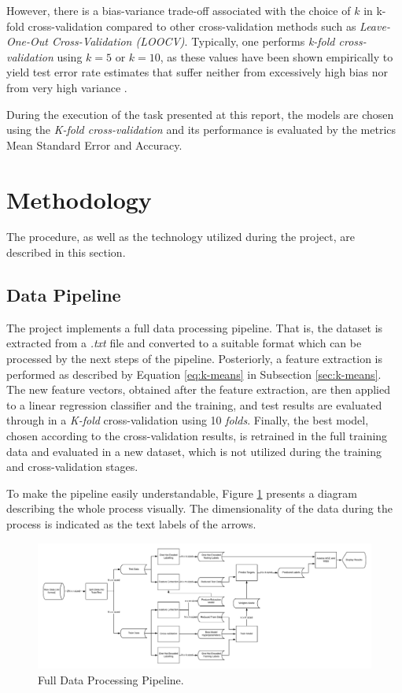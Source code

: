 \documentclass{article}
\begin{document}
However, there is a bias-variance trade-off associated with the choice of $k$ in k-fold cross-validation compared to other cross-validation methods such as \textit{Leave-One-Out Cross-Validation (LOOCV)}. Typically, one performs \textit{k-fold cross-validation} using $k = 5$ or $k = 10$, as these values have been shown empirically to yield test error rate estimates that suffer neither from excessively high bias nor from very high variance \parencite{james2013introduction}.

During the execution of the task presented at this report, the models are chosen using the \textit{K-fold cross-validation} and its performance is evaluated by the metrics Mean Standard Error and Accuracy.

\section{Methodology}

The procedure, as well as the technology utilized during the project, are described in this section. 

\subsection{Data Pipeline}

The project implements a full data processing pipeline. That is, the dataset is extracted from a \textit{.txt} file and converted to a suitable format which can be processed by the next steps of the pipeline. Posteriorly, a feature extraction is performed as described by Equation \eqref{eq:k-means} in Subsection \ref{sec:k-means}. The new feature vectors, obtained after the feature extraction, are then applied to a linear regression classifier and the training, and test results are evaluated through in a \textit{K-fold} cross-validation using 10 \textit{folds}. Finally, the best model, chosen according to the cross-validation results, is retrained in the full training data and evaluated in a new dataset, which is not utilized during the training and cross-validation stages.

To make the pipeline easily understandable, Figure \ref{fig:pipeline} presents a diagram describing the whole process visually. The dimensionality of the data during the process is indicated as the text labels of the arrows.

\begin{figure}[h!]
    \centering
    \includegraphics[scale=0.37]{images/pipeline.png}
    \caption{Full Data Processing Pipeline.}
    \label{fig:pipeline}
\end{figure}
\end{document}
